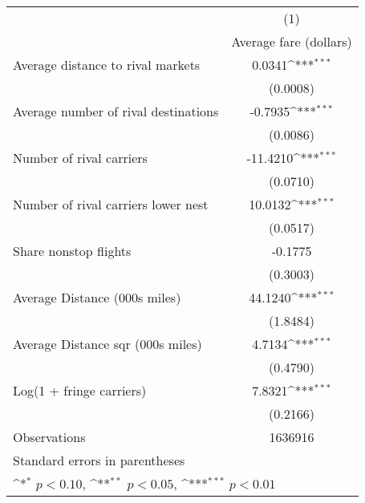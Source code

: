 {
\def\sym#1{\ifmmode^{#1}\else\(^{#1}\)\fi}
\begin{tabular}{l*{1}{c}}
\toprule
                    &\multicolumn{1}{c}{(1)}\\
                    &\multicolumn{1}{c}{Average fare (dollars)}\\
\midrule
Average distance to rival markets&      0.0341\sym{***}\\
                    &    (0.0008)         \\
\addlinespace
Average number of rival destinations&     -0.7935\sym{***}\\
                    &    (0.0086)         \\
\addlinespace
Number of rival carriers&    -11.4210\sym{***}\\
                    &    (0.0710)         \\
\addlinespace
Number of rival carriers lower nest&     10.0132\sym{***}\\
                    &    (0.0517)         \\
\addlinespace
Share nonstop flights &     -0.1775         \\
                    &    (0.3003)         \\
\addlinespace
Average Distance (000s miles)&     44.1240\sym{***}\\
                    &    (1.8484)         \\
\addlinespace
Average Distance sqr (000s miles)&      4.7134\sym{***}\\
                    &    (0.4790)         \\
\addlinespace
Log(1 + fringe carriers)&      7.8321\sym{***}\\
                    &    (0.2166)         \\
\midrule
Observations        &     1636916         \\
\bottomrule
\multicolumn{2}{l}{\footnotesize Standard errors in parentheses}\\
\multicolumn{2}{l}{\footnotesize \sym{*} \(p<0.10\), \sym{**} \(p<0.05\), \sym{***} \(p<0.01\)}\\
\end{tabular}
}
